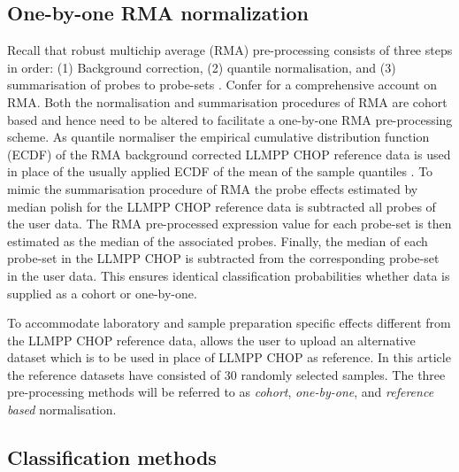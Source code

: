\documentclass{article}
\begin{document}




\subsection{One-by-one RMA normalization}
Recall that robust multichip average (RMA) pre-processing consists of three steps in order:
(1) Background correction,
(2) quantile normalisation, and
(3) summarisation of probes to probe-sets \citep{Irizarry2003}.
Confer \citet{Bolstad2004} for a comprehensive account on RMA.
Both the normalisation and summarisation procedures of RMA are cohort based and hence need to be altered to facilitate a one-by-one RMA pre-processing scheme.
As quantile normaliser the empirical cumulative distribution function (ECDF) of the RMA background corrected LLMPP CHOP reference data is used in place of the usually applied ECDF of the mean of the sample quantiles \citep{Bolstad2003}.
To mimic the summarisation procedure of RMA \citep{Irizarry2003b} the probe effects estimated by median polish for the LLMPP CHOP reference data is subtracted all probes of the user data.
The RMA pre-processed expression value for each probe-set is then estimated as the median of the associated probes.
Finally, the median of each probe-set in the LLMPP CHOP is subtracted from the corresponding probe-set in the user data.
This ensures identical classification probabilities whether data is supplied as a cohort or one-by-one.

To accommodate laboratory and sample preparation specific effects different from the LLMPP CHOP reference data, \hemaClass{} allows the user to upload an alternative dataset which is to be used in place of LLMPP CHOP as reference.
In this article the reference datasets have consisted of $30$ randomly selected samples.
The three pre-processing methods will be referred to as \emph{cohort}, \emph{one-by-one}, and \emph{reference based} normalisation.


\subsection{Classification methods}
\end{document}
